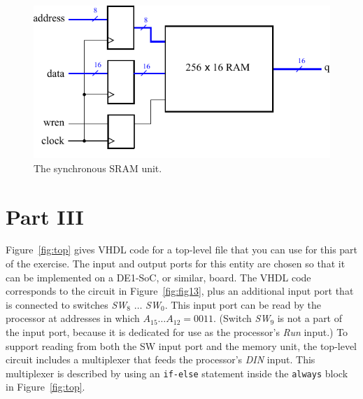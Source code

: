 \documentclass[epsfig,10pt,fullpage]{article} \addtolength{\textwidth}{1.5in}
\begin{document}
\begin{figure}[b]
\begin{center}
\includegraphics{figures/figure14.pdf}
\end{center}
\vspace{-0.5cm}
\caption{The synchronous SRAM unit.}
\label{fig:fig14}
\end{figure}

\section*{Part III}

Figure~\ref{fig:top} gives VHDL code for a top-level file that you can use for this
part of the exercise. The input and output ports for this entity are chosen so that it can
be implemented on a DE1-SoC, or similar, board. The VHDL code corresponds to the circuit 
in Figure~\ref{fig:fig13},
plus an additional input port that is connected to switches {\it SW}$_8$ $\ldots$ {\it SW}$_0$.
This input port can be read by the processor at addresses in which $A_{15} \ldots A_{12} = 0011$.
(Switch {\it SW}$_9$ is not a part of the input port, because it is dedicated for use as the
processor's {\it Run} input.) To support reading from both the SW input port and the memory
unit, the top-level circuit includes a multiplexer that feeds the processor's {\it DIN}
input. This multiplexer is described by using an \texttt{if-else} statement inside 
the \texttt{always} block in Figure~\ref{fig:top}.
\end{document}
